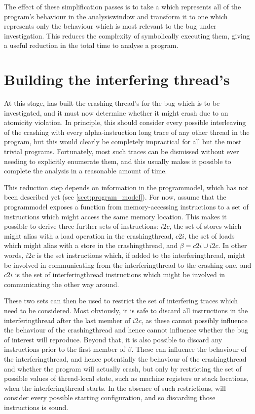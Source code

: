 The effect of these simplification passes is to take a {\StateMachine}
which represents all of the program's behaviour in the
\gls{analysiswindow} and transform it to one which represents only the
behaviour which is most relevant to the bug under investigation.  This
reduces the complexity of symbolically executing them, giving a useful
reduction in the total time to analyse a program.

\section{Building the interfering thread's \StateMachines}
\label{sect:derive:write_side}

At this stage, {\technique} has built the crashing thread's
{\StateMachine} for the bug which is to be investigated, and it must
now determine whether it might crash due to an atomicity violation.
In principle, this should consider every possible interleaving of the
crashing {\StateMachine} with every \gls{alpha}-instruction long trace
of any other thread in the program, but this would clearly be
completely impractical for all but the most trivial programs.
Fortunately, most such traces can be dismissed without ever needing to
explicitly enumerate them, and this usually makes it possible to
complete the analysis in a reasonable amount of time.

This reduction step depends on information in the \gls{programmodel},
which has not been described yet (see \autoref{sect:program_model}).
For now, assume that the \gls{programmodel} exposes a function from
memory-accessing instructions to a set of instructions which might
access the same memory location.  This makes it possible to derive
three further sets of instructions: $i2c$, the set of stores which
might alias with a load operation in the \gls{crashingthread}, $c2i$,
the set of loads which might alias with a store in the
\gls{crashingthread}, and $\beta = c2i \cup i2c$.  In other words,
$i2c$ is the set instructions which, if added to the
\gls{interferingthread}, might be involved in communicating from the
\gls{interferingthread} to the crashing one, and $c2i$ is the set of
\gls{interferingthread} instructions which might be involved in
communicating the other way around.

These two sets can then be used to restrict the set of interfering
traces which need to be considered.  Most obviously, it is safe to
discard all instructions in the \gls{interferingthread} after the last
member of $i2c$, as these cannot possibly influence the behaviour of
the \gls{crashingthread} and hence cannot influence whether the bug of
interest will reproduce.  Beyond that, it is also possible to discard
any instructions prior to the first member of $\beta$.  These can
influence the behaviour of the \gls{interferingthread}, and hence
potentially the behaviour of the \gls{crashingthread} and whether the
program will actually crash, but only by restricting the set of
possible values of thread-local state, such as machine registers or
stack locations, when the \gls{interferingthread} starts.  In the
absence of such restrictions, {\technique} will consider every
possible starting configuration, and so discarding those instructions
is sound.

